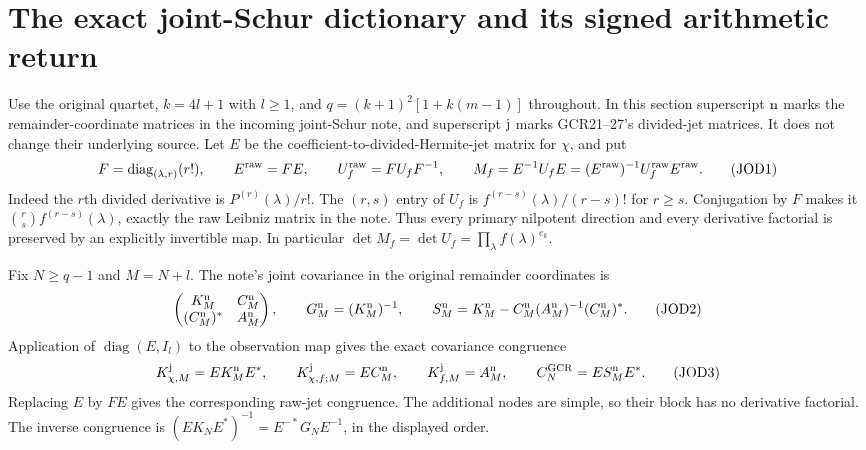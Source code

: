 \section{The exact joint-Schur dictionary and its signed arithmetic return}

Use the original quartet, $k=4l+1$ with $l\geq1$, and
$q=(k+1)^2[1+k(m-1)]$ throughout. In this section superscript
${\rm n}$ marks the remainder-coordinate matrices in the incoming
joint-Schur note, and superscript ${\rm j}$ marks GCR21--27's
divided-jet matrices. It does not change their underlying source.
Let $E$ be the coefficient-to-divided-Hermite-jet matrix for $\chi$,
and put
\[
 F=\operatorname{diag}_{(\lambda,r)}(r!),\qquad
 E^{\rm raw}=FE,\qquad
 U_f^{\rm raw}=FU_fF^{-1},\qquad
 M_f=E^{-1}U_fE=(E^{\rm raw})^{-1}U_f^{\rm raw}E^{\rm raw}.
 \tag{JOD1}
\]
Indeed the $r$th divided derivative is $P^{(r)}(\lambda)/r!$.
The $(r,s)$ entry of $U_f$ is $f^{(r-s)}(\lambda)/(r-s)!$
for $r\geq s$. Conjugation by $F$ makes it
$\binom rs f^{(r-s)}(\lambda)$, exactly the raw Leibniz matrix
in the note. Thus every primary nilpotent direction and every
derivative factorial is preserved by an explicitly invertible map.
In particular $\det M_f=\det U_f=\prod_\lambda f(\lambda)^{e_k}$.

Fix $N\geq q-1$ and $M=N+l$. The note's joint covariance in
the original remainder coordinates is
\[
 \begin{pmatrix}K_M^{\rm n}&C_M^{\rm n}\\
 (C_M^{\rm n})^*&A_M^{\rm n}\end{pmatrix},\qquad
 G_M^{\rm n}=(K_M^{\rm n})^{-1},\qquad
 S_M^{\rm n}=K_M^{\rm n}-C_M^{\rm n}(A_M^{\rm n})^{-1}(C_M^{\rm n})^*.
 \tag{JOD2}
\]
Application of $\operatorname{diag}(E,I_l)$ to the observation
map gives the exact covariance congruence
\[
 K_{\chi,M}^{\rm j}=EK_M^{\rm n}E^*,\qquad
 K_{\chi,f;M}^{\rm j}=EC_M^{\rm n},\qquad
 K_{f,M}^{\rm j}=A_M^{\rm n},\qquad
 C_N^{\rm GCR}=ES_M^{\rm n}E^*.
 \tag{JOD3}
\]
Replacing $E$ by $FE$ gives the corresponding raw-jet
congruence. The additional nodes are simple, so their block has
no derivative factorial. The inverse congruence is
$(EK_NE^*)^{-1}=E^{-*}G_NE^{-1}$, in the displayed order.

